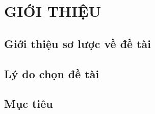 





\tableofcontents
\newpage



\newpage

\chapter{GIỚI THIỆU}
\section{Giới thiệu sơ lược về đề tài}



\section{Lý do chọn đề tài}



\section{Mục tiêu}




